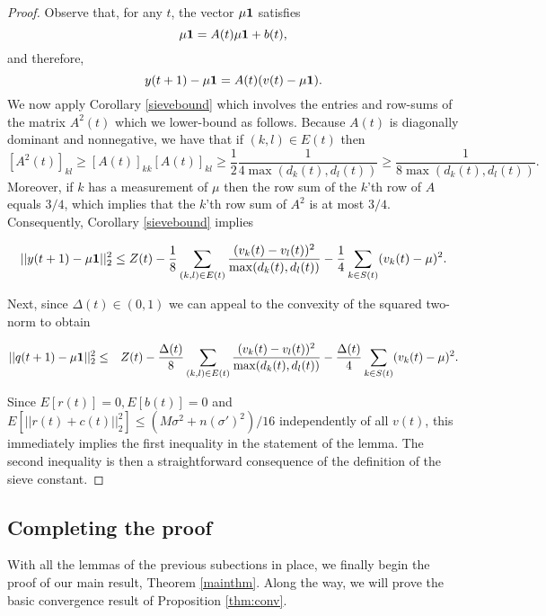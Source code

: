 \documentclass[final]{siamltex}
\begin{document}
\begin{proof} Observe that, for any $t$, the vector $\mu {{\bf 1}}$ satisfies \[ \mu {{\bf 1}} = A(t) \mu {{\bf 1}} + b(t),\] and therefore, 
\begin{equation} \label{yminusmu} y(t+1) - \mu {{\bf 1}}  =   A(t) (v(t) - \mu {{\bf 1}}).
\end{equation}  We now apply Corollary \ref{sievebound} which involves the entries and row-sums of the matrix $A^2(t)$ which we lower-bound as follows. Because $A(t)$ is diagonally dominant {{{and nonnegative}}}, we have that if $(k,l) \in E(t)$ then $$ [A^2(t)]_{kl} \geq [A(t)]_{kk} [A(t)]_{kl} \geq \frac{1}{2} \frac{1}{4 \max( d_k(t), d_l(t))} \geq \frac{1}{8 \max (d_k(t), d_l(t))}.$$ Moreover, if $k$ has a measurement of $\mu$ then the row
sum of the $k$'th row of $A$ {{{equals}}} $3/4$, which implies that the $k$'th row sum of $A^2$ is {{{at most}}} $3/4$.  Consequently,  Corollary \ref{sievebound} implies
\begin{small} \begin{equation} ||y(t+1) - \mu {{\bf 1}}||_2^2   \leq   Z({{{t}}})  - \frac{1}{8} \sum_{(k,l) \in E(t)} \frac{(v_k(t)-v_l(t))^2}{\max (d_k(t), d_l(t))} - \frac{1}{4  } \sum_{k \in S(t)} (v_k(t) - \mu)^2.  \label{eq:subtractbound} 
\end{equation} \end{small} Next, {{{since $\Delta(t) \in (0,1)$ we can appeal to the convexity of the squared two-norm to obtain}}}
\begin{small} \begin{eqnarray*}   ||q(t+1) - \mu {{\bf 1}}||_2^2   & \leq &   Z({{{t}}})  - \frac{\Delta(t)}{8} \sum_{(k,l) \in E(t)} \frac{(v_k(t)-v_l(t))^2}{\max (d_k(t), d_l(t))} - \frac{\Delta(t)}{4} \sum_{k \in S(t)} (v_k(t) - \mu)^2. 
\end{eqnarray*} \end{small} Since $E[r(t)]= 0, {{{E[b(t)]=0}}}$ and ${{{E[||r(t) + c(t)||_2^2] \leq  (M\sigma^2 + n(\sigma')^2)/16}}}$ independently of {{{all}}} $v(t)$, this immediately implies the first inequality in the statement of the lemma. The second inequality is then a straightforward consequence of the
definition of the sieve constant.
\end{proof} 

\subsection{Completing the proof\label{sec:proof}} With all the lemmas of the previous subections in place, we finally begin the proof of our main result,
Theorem \ref{mainthm}. Along the way, we will prove the basic convergence result of Proposition \ref{thm:conv}. 
\end{document}
